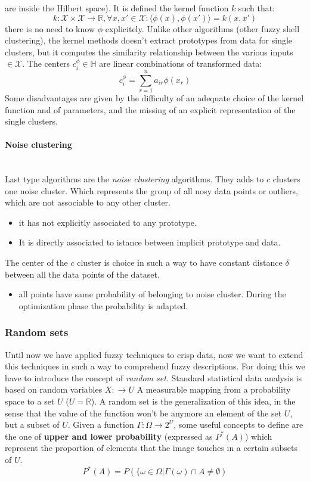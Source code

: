 \documentclass{article}
\begin{document}
are inside the Hilbert space). It is defined the kernel function $k$ such that:
$$k:\mathcal{X}\times\mathcal{X}\rightarrow\mathbb{R},\forall x,x'\in\mathcal{X}:\langle\phi(x),\phi(x')\rangle = k(x,x')$$
there is no need to know $\phi$ explicitely. Unlike other algorithms (other
fuzzy shell clustering), the kernel methods doesn't extract prototypes
from data for single clusters, but it computes the similarity relationship between the various inputs $\in\mathcal{X}$.
\newline\newline
The centers $c_i^\phi\in\mathbb{H}$ are linear combinations of transformed data:
$$c_i^\phi=\sum_{r=1}^n a_{ir}\phi(x_r)$$
Some disadvantages are given by the difficulty of an adequate choice of the kernel function and of
parameters, and the missing of an explicit representation of the single clusters.

\paragraph{Noise clustering}\mbox{}\\
Last type algorithms are the \textit{noise clustering} algorithms. They adds to $c$ clusters
one noise cluster.
Which represents the group of all nosy data points or outliers, which
are not associable to any other cluster.
\begin{itemize}
    \item it has not explicitly associated to any
          prototype.
    \item It is directly associated to istance between implicit prototype and data.
\end{itemize}
The center of the $c$ cluster is choice in such a way to have constant
distance $\delta$ between all the data points of the dataset.
\begin{itemize}
    \item all points have same probability of belonging to noise cluster. During the optimization
          phase the probability is adapted.
\end{itemize}

\subsubsection{Random sets}
Until now we have applied fuzzy techniques to crisp data, now we want to extend this
techniques in such a way to comprehend fuzzy descriptions. For doing this we have to introduce
the concept of \textit{random set}.
Standard statistical data analysis is based on random variables $X:\rightarrow U$
A measurable mapping from a probability space to a set $U$ ($U=\mathbb{R}$). A random set
is the generalization of this idea, in the sense that the value of the function won't be anymore
an element of the set $U$, but a subset of $U$. Given a function $\Gamma :\Omega\rightarrow 2^U$,
some useful concepts to define are the one of \textbf{upper and lower probability} (expressed as $P^*(A)$)
which represent the proportion of elements that the image touches in a certain subsets of $U$.
$$P^*(A)=P\left(\{\omega\in\Omega|\Gamma(\omega)\cap A\neq\emptyset\right)$$
\end{document}
